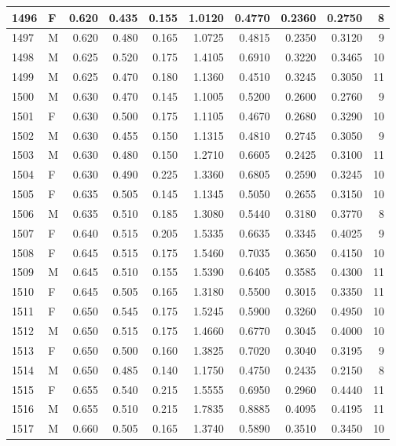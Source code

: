 \documentclass[9pt,twocolumn,twoside,]{pnas-new}
\begin{document}
\begin{tabular}{l|l|r|r|r|r|r|r|r|r}
\hline
1496 & F & 0.620 & 0.435 & 0.155 & 1.0120 & 0.4770 & 0.2360 & 0.2750 & 8\\
\hline
1497 & M & 0.620 & 0.480 & 0.165 & 1.0725 & 0.4815 & 0.2350 & 0.3120 & 9\\
\hline
1498 & M & 0.625 & 0.520 & 0.175 & 1.4105 & 0.6910 & 0.3220 & 0.3465 & 10\\
\hline
1499 & M & 0.625 & 0.470 & 0.180 & 1.1360 & 0.4510 & 0.3245 & 0.3050 & 11\\
\hline
1500 & M & 0.630 & 0.470 & 0.145 & 1.1005 & 0.5200 & 0.2600 & 0.2760 & 9\\
\hline
1501 & F & 0.630 & 0.500 & 0.175 & 1.1105 & 0.4670 & 0.2680 & 0.3290 & 10\\
\hline
1502 & M & 0.630 & 0.455 & 0.150 & 1.1315 & 0.4810 & 0.2745 & 0.3050 & 9\\
\hline
1503 & M & 0.630 & 0.480 & 0.150 & 1.2710 & 0.6605 & 0.2425 & 0.3100 & 11\\
\hline
1504 & F & 0.630 & 0.490 & 0.225 & 1.3360 & 0.6805 & 0.2590 & 0.3245 & 10\\
\hline
1505 & F & 0.635 & 0.505 & 0.145 & 1.1345 & 0.5050 & 0.2655 & 0.3150 & 10\\
\hline
1506 & M & 0.635 & 0.510 & 0.185 & 1.3080 & 0.5440 & 0.3180 & 0.3770 & 8\\
\hline
1507 & F & 0.640 & 0.515 & 0.205 & 1.5335 & 0.6635 & 0.3345 & 0.4025 & 9\\
\hline
1508 & F & 0.645 & 0.515 & 0.175 & 1.5460 & 0.7035 & 0.3650 & 0.4150 & 10\\
\hline
1509 & M & 0.645 & 0.510 & 0.155 & 1.5390 & 0.6405 & 0.3585 & 0.4300 & 11\\
\hline
1510 & F & 0.645 & 0.505 & 0.165 & 1.3180 & 0.5500 & 0.3015 & 0.3350 & 11\\
\hline
1511 & F & 0.650 & 0.545 & 0.175 & 1.5245 & 0.5900 & 0.3260 & 0.4950 & 10\\
\hline
1512 & M & 0.650 & 0.515 & 0.175 & 1.4660 & 0.6770 & 0.3045 & 0.4000 & 10\\
\hline
1513 & F & 0.650 & 0.500 & 0.160 & 1.3825 & 0.7020 & 0.3040 & 0.3195 & 9\\
\hline
1514 & M & 0.650 & 0.485 & 0.140 & 1.1750 & 0.4750 & 0.2435 & 0.2150 & 8\\
\hline
1515 & F & 0.655 & 0.540 & 0.215 & 1.5555 & 0.6950 & 0.2960 & 0.4440 & 11\\
\hline
1516 & M & 0.655 & 0.510 & 0.215 & 1.7835 & 0.8885 & 0.4095 & 0.4195 & 11\\
\hline
1517 & M & 0.660 & 0.505 & 0.165 & 1.3740 & 0.5890 & 0.3510 & 0.3450 & 10\\

\end{tabular}
\end{document}
